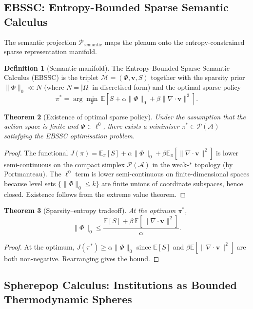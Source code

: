 \documentclass[12pt, a4paper]{article}
\theoremstyle{plain}
\newtheorem{theorem}{Theorem}[section]
\theoremstyle{definition}
\newtheorem{definition}[theorem]{Definition}
\theoremstyle{remark}
\newcommand{\vfield}{\mathbf{v}}
\newcommand{\Proj}[1]{\mathcal{P}_{#1}}
\newcommand{\divv}{\nabla\!\cdot\!\vfield}
\begin{document}
\subsection{EBSSC: Entropy-Bounded Sparse Semantic Calculus}

The semantic projection $\Proj{\mathrm{semantic}}$ maps the plenum onto the
entropy-constrained sparse representation manifold.

\begin{definition}[Semantic manifold]
\label{def:ebssc}
The Entropy-Bounded Sparse Semantic Calculus (EBSSC) is the triplet
$\mathcal{M} = (\Phi, \vfield, S)$ together with the sparsity prior
$\|\Phi\|_0 \ll N$ (where $N = |\Omega|$ in discretised form) and the optimal sparse
policy
\[
\pi^* = \arg\min_{\pi}\,\mathbb{E}\!\left[S + \alpha\|\Phi\|_0 + \beta\|\divv\|^2\right].
\]
\end{definition}

\begin{theorem}[Existence of optimal sparse policy]
\label{thm:sparse}
Under the assumption that the action space is finite and $\Phi \in \ell^0$, there
exists a minimiser $\pi^* \in \mathcal{P}(\mathcal{A})$ satisfying the EBSSC
optimisation problem.
\end{theorem}

\begin{proof}
The functional $J(\pi) = \mathbb{E}_\pi[S] + \alpha\|\Phi\|_0 + \beta\mathbb{E}_\pi[\|\divv\|^2]$
is lower semi-continuous on the compact simplex $\mathcal{P}(\mathcal{A})$ in the
weak-$*$ topology (by Portmanteau).  The $\ell^0$ term is lower semi-continuous on
finite-dimensional spaces because level sets $\{\|\Phi\|_0 \leq k\}$ are finite unions
of coordinate subspaces, hence closed.  Existence follows from the extreme value theorem.
\end{proof}

\begin{theorem}[Sparsity--entropy tradeoff]
\label{thm:tradeoff}
At the optimum $\pi^*$,
\[
\|\Phi\|_0 \leq \frac{\mathbb{E}[S] + \beta\,\mathbb{E}[\|\divv\|^2]}{\alpha}.
\]
\end{theorem}

\begin{proof}
At the optimum, $J(\pi^*) \geq \alpha\|\Phi\|_0$ since $\mathbb{E}[S]$ and
$\beta\mathbb{E}[\|\divv\|^2]$ are both non-negative.  Rearranging gives the bound.
\end{proof}

\subsection{Spherepop Calculus: Institutions as Bounded Thermodynamic Spheres}
\end{document}
